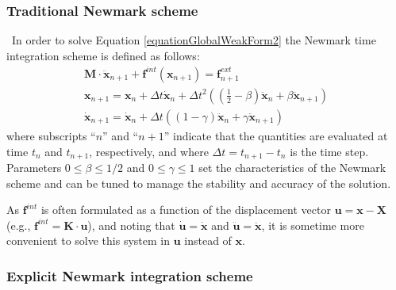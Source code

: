\documentclass[oneside,11pt,times]{book}
\begin{document}
\subsubsection{Traditional Newmark scheme}\
In order to solve Equation \eqref{equationGlobalWeakForm2} the Newmark time integration scheme is defined as follows:
\begin{eqnarray}
 & \displaystyle{\bm{M}\cdot \ddot{\bm{x}}_{n+1} + \bm{f}^{int}(\bm{x}_{n+1}) =   \bm{f}^{ext}_{n+1}}  & \label{equationGeneralNewmark1} \\
 & \displaystyle{\bm{x}_{n+1} = \bm{x}_{n} + \Delta t \dot{\bm{x}}_{n} + \Delta t^2 \left(
   \left(\frac{1}{2} - \beta \right) \ddot{\bm{x}}_{n} + \beta \ddot{\bm{x}}_{n+1} \right)} &
   \label{equationGeneralNewmark2} \\
 & \displaystyle{\dot{\bm{x}}_{n+1} = \dot{\bm{x}}_{n} + \Delta t \left( \left(1 - \gamma \right)
   \ddot{\bm{x}}_{n} + \gamma \ddot{\bm{x}}_{n+1} \right)} & \label{equationGeneralNewmark3}
\end{eqnarray}
%
where subscripts ``$n$'' and ``$n+1$'' indicate that the quantities are evaluated at time $t_{n}$ and $t_{n+1}$, respectively, and where $\Delta t = t_{n+1}-t_{n}$ is the time step. Parameters $0 \le \beta \le 1/2$ and $0 \le \gamma \le 1$ set the characteristics of the Newmark scheme and can be tuned to manage the stability and accuracy of the solution.

As $\bm{f}^{int}$ is often formulated as a function of the displacement vector $\bm{u}=\bm{x}-\bm{X}$ (e.g., $\bm{f}^{int}=\bm{K}\cdot\bm{u}$), and noting that $\dot{\bm{u}}=\dot{\bm{x}}$ and $\ddot{\bm{u}}=\ddot{\bm{x}}$, it is sometime more convenient to solve this system in $\bm{u}$ instead of $\bm{x}$.

\subsubsection{Explicit Newmark integration scheme}
 \label{subsectionExplicitNewmarkScheme}
\end{document}
